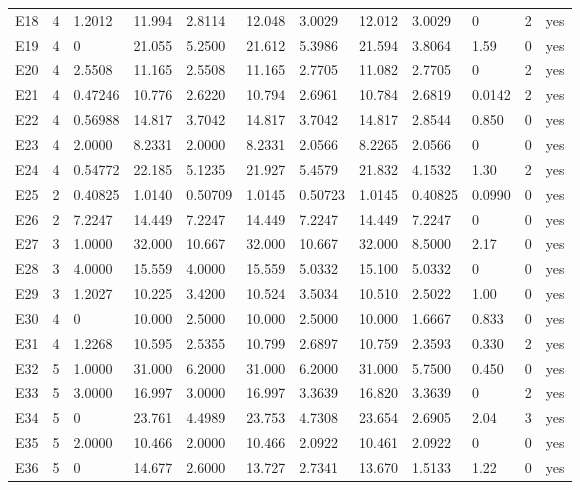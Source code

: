 {\begin{longtable}{@{}llllllllllll@{}}
E18 & 4 & 1.2012 & 11.994 & 2.8114 & 12.048 & 3.0029 & 12.012 & 3.0029 & 0 & 2 & yes \\
E19 & 4 & 0 & 21.055 & 5.2500 & 21.612 & 5.3986 & 21.594 & 3.8064 & 1.59 & 0 & yes \\
E20 & 4 & 2.5508 & 11.165 & 2.5508 & 11.165 & 2.7705 & 11.082 & 2.7705 & 0 & 2 & yes \\
E21 & 4 & 0.47246 & 10.776 & 2.6220 & 10.794 & 2.6961 & 10.784 & 2.6819 & 0.0142 & 2 & yes \\
E22 & 4 & 0.56988 & 14.817 & 3.7042 & 14.817 & 3.7042 & 14.817 & 2.8544 & 0.850 & 0 & yes \\
E23 & 4 & 2.0000 & 8.2331 & 2.0000 & 8.2331 & 2.0566 & 8.2265 & 2.0566 & 0 & 0 & yes \\
E24 & 4 & 0.54772 & 22.185 & 5.1235 & 21.927 & 5.4579 & 21.832 & 4.1532 & 1.30 & 2 & yes \\
E25 & 2 & 0.40825 & 1.0140 & 0.50709 & 1.0145 & 0.50723 & 1.0145 & 0.40825 & 0.0990 & 0 & yes \\
E26 & 2 & 7.2247 & 14.449 & 7.2247 & 14.449 & 7.2247 & 14.449 & 7.2247 & 0 & 0 & yes \\
E27 & 3 & 1.0000 & 32.000 & 10.667 & 32.000 & 10.667 & 32.000 & 8.5000 & 2.17 & 0 & yes \\
E28 & 3 & 4.0000 & 15.559 & 4.0000 & 15.559 & 5.0332 & 15.100 & 5.0332 & 0 & 0 & yes \\
E29 & 3 & 1.2027 & 10.225 & 3.4200 & 10.524 & 3.5034 & 10.510 & 2.5022 & 1.00 & 0 & yes \\
E30 & 4 & 0 & 10.000 & 2.5000 & 10.000 & 2.5000 & 10.000 & 1.6667 & 0.833 & 0 & yes \\
E31 & 4 & 1.2268 & 10.595 & 2.5355 & 10.799 & 2.6897 & 10.759 & 2.3593 & 0.330 & 2 & yes \\
E32 & 5 & 1.0000 & 31.000 & 6.2000 & 31.000 & 6.2000 & 31.000 & 5.7500 & 0.450 & 0 & yes \\
E33 & 5 & 3.0000 & 16.997 & 3.0000 & 16.997 & 3.3639 & 16.820 & 3.3639 & 0 & 2 & yes \\
E34 & 5 & 0 & 23.761 & 4.4989 & 23.753 & 4.7308 & 23.654 & 2.6905 & 2.04 & 3 & yes \\
E35 & 5 & 2.0000 & 10.466 & 2.0000 & 10.466 & 2.0922 & 10.461 & 2.0922 & 0 & 0 & yes \\
E36 & 5 & 0 & 14.677 & 2.6000 & 13.727 & 2.7341 & 13.670 & 1.5133 & 1.22 & 0 & yes \\
\end{longtable}}
